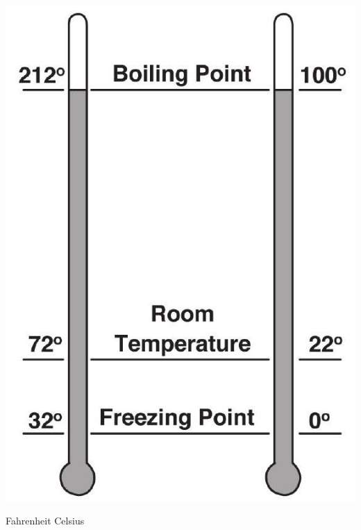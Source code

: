 \documentclass[10pt]{article}
\begin{document}
\includegraphics[max width=\textwidth]{2022_09_11_72dbedc910e6e984560cg-39}

Fahrenheit Celsius
\end{document}
